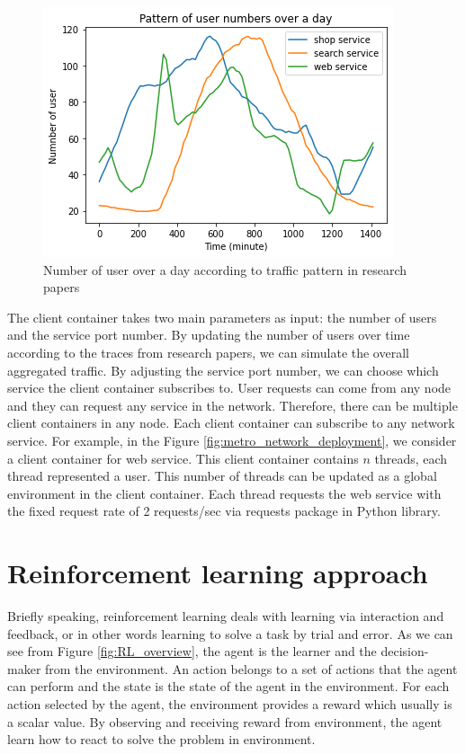 \documentclass[conference]{IEEEtran}
\begin{document}
\begin{figure}[]
    \centering
    \includegraphics[scale = 0.55]{imgs/user_pattern_a_day.png}
    \caption{Number of user over a day according to traffic pattern in research papers}
    \label{fig:user_pattern}
\end{figure}

The client container takes two main parameters as input: the number of users and the service port number. By updating the number of users over time according to the traces from research papers, we can simulate the overall aggregated traffic. By adjusting the service port number, we can choose which service the client container subscribes to. User requests can come from any node and they can request any service in the network. Therefore, there can be multiple client containers in any node. Each client container can subscribe to any network service. For example, in the Figure \ref{fig:metro_network_deployment}, we consider a client container for web service. This client container contains $n$ threads, each thread represented a user. This number of threads can be updated as a global environment in the client container. Each thread requests the web service with the fixed request rate of 2 requests/sec via requests package in Python library.



\section{Reinforcement learning approach}
\label{sec:RL_Agent}
Briefly speaking, reinforcement learning deals with learning via interaction and feedback, or in other words learning to solve a task by trial and error. As we can see from Figure \ref{fig:RL_overview}, the agent is the learner and the decision-maker from the environment. An action belongs to a set of actions that the agent can perform and the state is the state of the agent in the environment. For each action selected by the agent, the environment provides a reward which usually is a scalar value. By observing and receiving reward from environment, the agent learn how to react to solve the problem in environment. 
\end{document}
